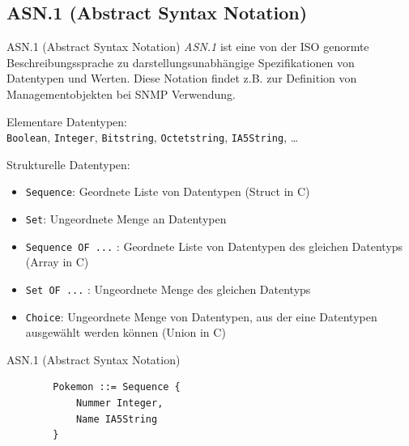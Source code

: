 \subsection{ASN.1 (Abstract Syntax Notation)}

\begin{defi}{ASN.1 (Abstract Syntax Notation)}
    \emph{ASN.1} ist eine von der ISO genormte Beschreibungssprache zu darstellungsunabhängige Spezifikationen von Datentypen und Werten.
    Diese Notation findet z.B. zur Definition von Managementobjekten bei SNMP Verwendung.

    Elementare Datentypen:\\
    \texttt{Boolean}, \texttt{Integer}, \texttt{Bitstring}, \texttt{Octetstring}, \texttt{IA5String}, \ldots

    Strukturelle Datentypen:

    \begin{itemize}
        \item \texttt{Sequence}: Geordnete Liste von Datentypen (Struct in C)
        \item \texttt{Set}: Ungeordnete Menge an Datentypen
        \item \texttt{Sequence OF ...} : Geordnete Liste von Datentypen des gleichen Datentyps (Array in C)
        \item \texttt{Set OF ...} : Ungeordnete Menge des gleichen Datentyps
        \item \texttt{Choice}: Ungeordnete Menge von Datentypen, aus der eine Datentypen ausgewählt werden können (Union in C)
    \end{itemize}
\end{defi}

\begin{example}{ASN.1 (Abstract Syntax Notation)}
    \begin{lstlisting}
        Pokemon ::= Sequence {
            Nummer Integer,
            Name IA5String
        }
    \end{lstlisting}
\end{example}


